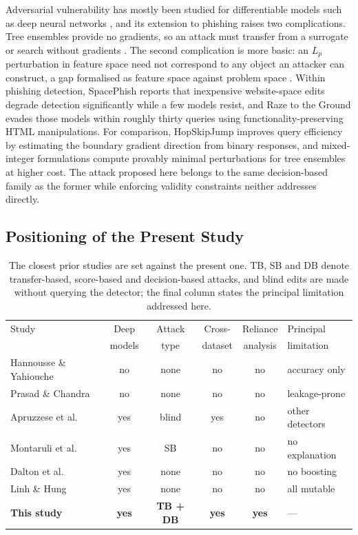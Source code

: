 \documentclass[runningheads]{llncs}
\begin{document}
Adversarial vulnerability has mostly been studied for differentiable models
such as deep neural networks \cite{madry2018}, and its extension to phishing raises two complications. Tree
ensembles provide no gradients, so an attack must transfer from a surrogate
\cite{papernot2017} or search without gradients \cite{brendel2018,chen2020}.
The second complication is more basic: an $L_p$ perturbation in feature space
need not correspond to any object an attacker can construct, a gap formalised as
feature space against problem space \cite{pierazzi2020}.
Within phishing detection, SpacePhish \cite{apruzzese2022} reports that
inexpensive website-space edits degrade detection significantly while a few
models resist, and Raze to the Ground \cite{montaruli2023} evades those models
within roughly thirty queries using functionality-preserving HTML manipulations.
For comparison, HopSkipJump \cite{chen2020} improves query efficiency by
estimating the boundary gradient direction from binary responses, and
mixed-integer formulations compute provably minimal perturbations for tree
ensembles at higher cost. The attack proposed here belongs to the same
decision-based family as the former while enforcing validity constraints neither
addresses directly.

\subsection{Positioning of the Present Study}
\begin{table}[!htbp]
\centering
\caption{The closest prior studies are set against the present one. TB, SB and
DB denote transfer-based, score-based and decision-based attacks, and blind edits
are made without querying the detector; the final column states the principal
limitation addressed here.}
\label{tab:gap}
\footnotesize
\setlength{\tabcolsep}{2.6pt}
\begin{tabular}{lccccL{2.3cm}}
\toprule
Study & Deep & Attack & Cross- & Reliance & Principal \\
      & models & type & dataset & analysis & limitation \\
\midrule
Hannousse \& Yahiouche \cite{hannousse2021} & no & none & no & no & accuracy only \\
Prasad \& Chandra \cite{prasad2024}         & no & none & no & no & leakage-prone \\
Apruzzese et al.\ \cite{apruzzese2022}      & yes & blind & yes & no & other detectors \\
Montaruli et al.\ \cite{montaruli2023}      & yes & SB & no & no & no explanation \\
Dalton et al.\ \cite{dalton2025}            & yes & none & no & no & no boosting \\
Linh \& Hung \cite{linh2025}                & yes & none & no & no & all mutable \\
\midrule
\textbf{This study} & \textbf{yes} & \textbf{TB + DB} & \textbf{yes} & \textbf{yes} & --- \\
\bottomrule
\end{tabular}
\end{table}
\end{document}
